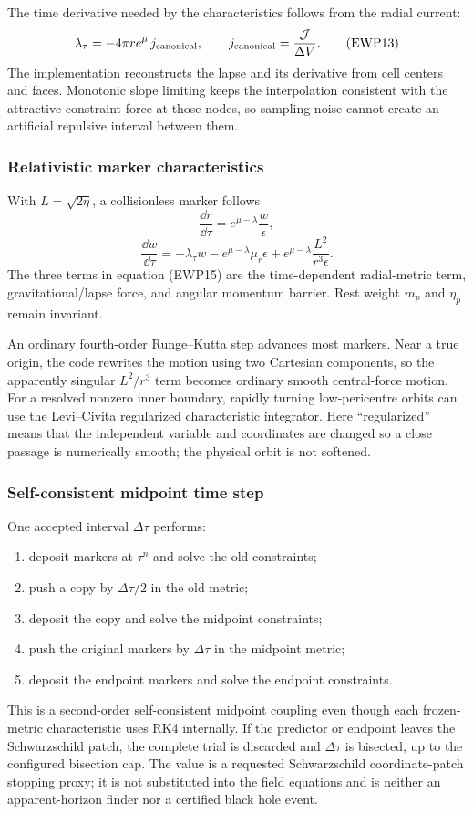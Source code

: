 The time derivative needed by the
characteristics follows from the radial current:
\[
 \lambda_\tau=-4\pi r e^\mu\,j_{\rm canonical},\qquad
 j_{\rm canonical}=\frac{{\cal J}}{\Delta V}.            \tag{EWP13}
\]
The implementation reconstructs the lapse and its derivative from cell
centers and faces.  Monotonic slope limiting keeps the interpolation
consistent with the attractive constraint force at those nodes, so sampling
noise cannot create an artificial repulsive interval between them.

\subsubsection{Relativistic marker characteristics}

With \(L=\sqrt{2\eta}\), a collisionless marker follows
\[
 \frac{\dd r}{\dd\tau}
 =e^{\mu-\lambda}\frac{w}{\epsilon},                    \tag{EWP14}
\]
\[
 \frac{\dd w}{\dd\tau}
 =-\lambda_\tau w
  -e^{\mu-\lambda}\mu_r\epsilon
  +e^{\mu-\lambda}\frac{L^2}{r^3\epsilon}.              \tag{EWP15}
\]
The three terms in equation (EWP15) are the time-dependent radial-metric
term, gravitational/lapse force, and angular momentum barrier.  Rest weight
\(m_p\) and \(\eta_p\) remain invariant.

An ordinary fourth-order Runge--Kutta step advances most markers.  Near a true
origin, the code rewrites the motion using two Cartesian components, so the
apparently singular \(L^2/r^3\) term becomes ordinary smooth central-force
motion.  For a resolved nonzero inner boundary, rapidly turning low-pericentre
orbits can use the Levi--Civita regularized characteristic integrator.  Here
``regularized'' means that the independent variable and coordinates are
changed so a close passage is numerically smooth; the physical orbit is not
softened.

\subsubsection{Self-consistent midpoint time step}

One accepted interval \(\Delta\tau\) performs:
\begin{enumerate}
\item deposit markers at \(\tau^n\) and solve the old constraints;
\item push a copy by \(\Delta\tau/2\) in the old metric;
\item deposit the copy and solve the midpoint constraints;
\item push the original markers by \(\Delta\tau\) in the midpoint metric;
\item deposit the endpoint markers and solve the endpoint constraints.
\end{enumerate}
This is a second-order self-consistent midpoint coupling even though each
frozen-metric characteristic uses RK4 internally.  If the predictor or
endpoint leaves the Schwarzschild patch, the complete trial is discarded and
\(\Delta\tau\) is bisected, up to the configured bisection cap.  The
 value is a requested Schwarzschild coordinate-patch stopping
proxy; it is not substituted into the field equations and is neither an
apparent-horizon finder nor a certified black hole event.

